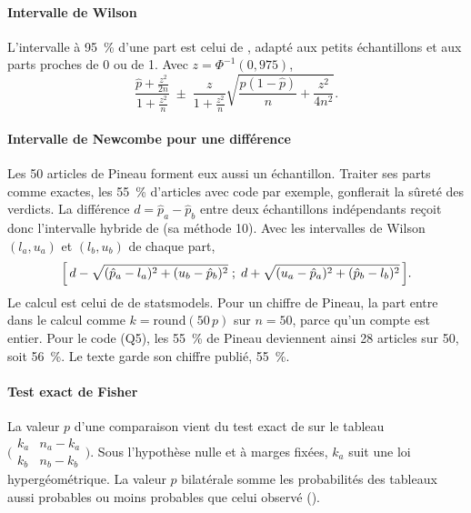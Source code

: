 \paragraph{Intervalle de Wilson}
L'intervalle à 95~\% d'une part est celui de \textcite{wilson1927probable}, adapté aux petits
échantillons et aux parts proches de 0 ou de 1. Avec $z = \Phi^{-1}(0{,}975)$,
\begin{equation}
  \frac{\hat{p} + \frac{z^2}{2n}}{1 + \frac{z^2}{n}}
  \;\pm\;
  \frac{z}{1 + \frac{z^2}{n}} \sqrt{\frac{\hat{p}(1 - \hat{p})}{n} + \frac{z^2}{4n^2}} .
\end{equation}

\paragraph{Intervalle de Newcombe pour une différence}
Les 50 articles de Pineau forment eux aussi un échantillon. Traiter ses parts comme exactes, les 55~\%
d'articles avec code par exemple, gonflerait la sûreté des verdicts. La différence $d = \hat{p}_a - \hat{p}_b$ entre deux échantillons indépendants reçoit
donc l'intervalle hybride de \textcite{newcombe1998interval} (sa méthode 10). Avec les intervalles de
Wilson $(l_a, u_a)$ et $(l_b, u_b)$ de chaque part,
\begin{equation}
  \Bigl[\, d - \sqrt{(\hat{p}_a - l_a)^2 + (u_b - \hat{p}_b)^2} \;;\;
  d + \sqrt{(u_a - \hat{p}_a)^2 + (\hat{p}_b - l_b)^2} \,\Bigr].
\end{equation}
Le calcul est celui de  de statsmodels. Pour un
chiffre de Pineau, la part entre dans le calcul comme $k = \mathrm{round}(50\,p)$ sur $n = 50$, parce qu'un
compte est entier. Pour le code (Q5), les 55~\% de Pineau deviennent ainsi 28 articles sur 50, soit 56~\%. Le
texte garde son chiffre publié, 55~\%.

\paragraph{Test exact de Fisher}
La valeur $p$ d'une comparaison vient du test exact de \textcite{fisher1922interpretation} sur le
tableau $\bigl(\begin{smallmatrix} k_a & n_a - k_a \\ k_b & n_b - k_b \end{smallmatrix}\bigr)$. Sous
l'hypothèse nulle et à marges fixées, $k_a$ suit une loi hypergéométrique. La valeur $p$ bilatérale
somme les probabilités des tableaux aussi probables ou moins probables que celui observé
().

